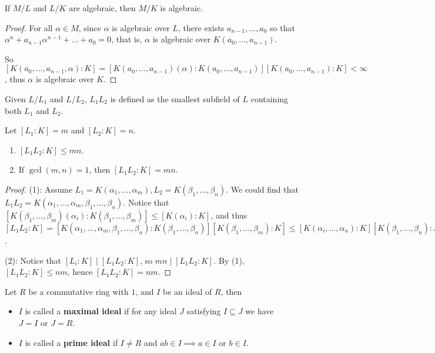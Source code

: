 \begin{prop} \label{prop:alg-tower-implies-alg}
  If $M/L$ and $L/K$ are algebraic, then $M/K$ is algebraic.

  \begin{proof}
    For all $\alpha \in M$, since $\alpha$ is algebraic over $L$,
    there exists $a_{n-1}, \dots, a_0$ so that $\alpha^n + a_{n-1} \alpha^{n-1} + \dots + a_0 = 0$,
    that is, $\alpha$ is algebraic over $K(a_0, \dots, a_{n-1})$.

    So $[K(a_0, \dots, a_{n-1}, \alpha): K] = [K(a_0, \dots, a_{n-1})(\alpha): K(a_0, \dots, a_{n-1})]
    [K(a_0, \dots, a_{n-1}): K] < \infty$, thus $\alpha$ is algebraic over $K$.
  \end{proof}
\end{prop}

\begin{definition}
  Given $L/L_1$ and $L/L_2$, $L_1 L_2$ is defined as the smallest subfield of $L$
  containing both $L_1$ and $L_2$.
\end{definition}

\begin{prop}
  Let $[L_1: K] = m$ and $[L_2: K] = n$.
  \begin{enumerate}[(\arabic*)]
    \item $[L_1 L_2: K] \leq mn$.
    \item If $\gcd(m, n) = 1$, then $[L_1 L_2: K] = mn$.
  \end{enumerate}

  \begin{proof}
    (1): Assume $L_1 = K(\alpha_1, \dots, \alpha_m), L_2 = K(\beta_1, \dots, \beta_n)$.
    We could find that $L_1 L_2 = K(\alpha_1, \dots, \alpha_m, \beta_1, \dots, \beta_n)$.
    Notice that $[K(\beta_1, \dots, \beta_m)(\alpha_i): K(\beta_1, \dots, \beta_m)] \leq [K(\alpha_i): K]$,
    and thus $[L_1 L_2: K] = [K(\alpha_1, \dots, \alpha_m, \beta_1, \dots, \beta_n)
    : K(\beta_1, \dots, \beta_n)] [K(\beta_1, \dots, \beta_m): K] \leq [K(\alpha_i, \dots, \alpha_n): K]
    [K(\beta_1, \dots, \beta_n): K] = [L_1: K][L_2: K]$.

    (2): Notice that $[L_i: K] \mid [L_1 L_2: K]$, so $mn \mid [L_1 L_2: K]$. By
    (1), $[L_1 L_2: K] \leq nm$, hence $[L_1 L_2: K] = nm$.
  \end{proof}
\end{prop}

\begin{definition}
  Let $R$ be a commutative ring with $1$, and $I$ be an ideal of $R$, then
  \begin{itemize}
    \item $I$ is called a {\bf maximal ideal} if for any ideal $J$ satisfying
      $I \subseteq J$ we have $J = I \text{ or } J = R$.
    \item $I$ is called a {\bf prime ideal}
      if $I \neq R$ and $ab \in I \implies a \in I \text{ or } b \in I$.
  \end{itemize}
\end{definition}

